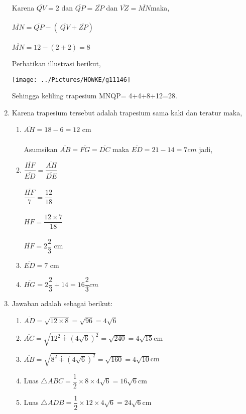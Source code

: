 \documentclass[12pt,a4paper]{article}
\begin{document}
\begin{enumerate}
		Karena $\overline{QV}=2$ dan $\overline{QP}=\overline{ZP}$ dan $\overline{VZ}=\overline{MN}$maka,\\
		\\
		$\overline{MN}=\overline{QP}- (\ \overline{QV}+\overline{ZP} )\ $\\
		\\
		$\overline{MN}= 12-(2+2)=8$
		
		Perhatikan illustrasi berikut,
		\begin{center}
		\texttt{[image: ../Pictures/HOWKE/g11146]}
		\end{center}
		
		Sehingga keliling trapesium MNQP= 4+4+8+12=28.	
		
		\item Karena trapesium tersebut adalah trapesium sama kaki dan teratur maka,
		\begin{enumerate}
			\item $\overline{AH}=18-6=12$ cm\\
			\\
			Asumsikan  $\overline{AB}=\overline{FG}=\overline{DC}$ maka $\overline{ED}=21-14=7 cm$ jadi,
			\item $\dfrac{\overline{HF}}{\overline{ED}}=\dfrac{\overline{AH}}{\overline{DE}}$\\
			\\
			$\dfrac{\overline{HF}}{7}=\dfrac{12}{18}$\\
			\\
			$\overline{HF}=\dfrac{12 \times 7}{18}$ \\
			\\
			$\overline{HF}=2\dfrac{2}{3}$ cm
			\item $\overline{ED}=7$ cm
			\item $\overline{HG}=2\dfrac{2}{3}+14=16\dfrac{2}{3} cm$  
		\end{enumerate}
		\item Jawaban adalah sebagai berikut:
		\begin{enumerate}
			\item $\overline{AD}=\sqrt{12\times 8}=\sqrt{96}=4 \sqrt{6}$
			\item $\overline{AC}=\sqrt{{12^2}\dotplus (4\sqrt{6})^2}=\sqrt{240}=4 \sqrt{15}$cm
			\item $\overline{AB}=\sqrt{{8^2}\dotplus (4\sqrt{6})^2}=\sqrt{160}=4 \sqrt{10}$cm
			\item Luas $\triangle ABC=\dfrac{1}{2} \times 8 \times 4\sqrt{6}=16\sqrt{6}$cm
			\item Luas $\triangle ADB=\dfrac{1}{2} \times 12 \times 4\sqrt{6}=24\sqrt{6}$cm

\end{enumerate}
\end{enumerate}
\end{document}
